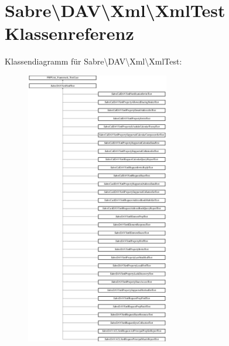 \hypertarget{class_sabre_1_1_d_a_v_1_1_xml_1_1_xml_test}{}\section{Sabre\textbackslash{}D\+AV\textbackslash{}Xml\textbackslash{}Xml\+Test Klassenreferenz}
\label{class_sabre_1_1_d_a_v_1_1_xml_1_1_xml_test}
Klassendiagramm für Sabre\textbackslash{}D\+AV\textbackslash{}Xml\textbackslash{}Xml\+Test\+:\begin{figure}[H]
\begin{center}
\leavevmode
\includegraphics[height=12.000000cm]{class_sabre_1_1_d_a_v_1_1_xml_1_1_xml_test}
\end{center}
\end{figure}
